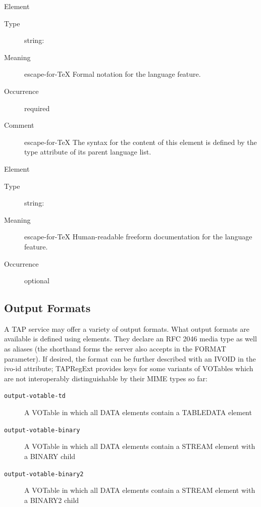 \documentclass{ivoa}
\begin{document}
\begingroup\small\begin{bigdescription}\item[Element \xmlel{form}]
\begin{description}
\item[Type] string: 
\item[Meaning] escape-for-TeX{{{
            Formal notation for the language feature.
          }}}
\item[Occurrence] required
\item[Comment] escape-for-TeX{{{
            The syntax for the content of this element is defined by the
            type attribute of its parent language list.
          }}}

\end{description}
\item[Element \xmlel{description}]
\begin{description}
\item[Type] string: 
\item[Meaning] escape-for-TeX{{{
            Human-readable freeform documentation for the language feature.
          }}}
\item[Occurrence] optional

\end{description}


\end{bigdescription}\endgroup

\endgroup

\subsection{Output Formats}

\label{outforms}

A TAP service may offer a variety of output formats.
What output formats are available is defined using
 elements.   They 
declare an RFC 2046 media type \citep{std:MIME} as well
as aliases (the shorthand forms the server also accepts in the 
FORMAT parameter).  If desired, the format can be further described with an
IVOID in the ivo-id attribute; TAPRegExt provides keys for some variants of
VOTables which are not interoperably distinguishable by their MIME types so far:


\begin{description}
\item[\normalfont\texttt{output-votable-td}]A VOTable in which all DATA elements contain a TABLEDATA element
\item[\normalfont\texttt{output-votable-binary}]A VOTable in which all DATA elements contain a STREAM element
	with a BINARY child
\item[\normalfont\texttt{output-votable-binary2}]A VOTable in which all DATA elements contain a STREAM element
	with a BINARY2 child
\end{description}
\end{document}
